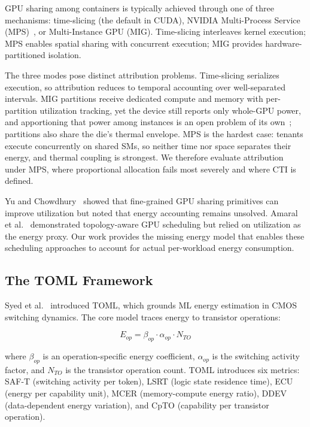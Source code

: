 \documentclass[conference]{IEEEtran}
\begin{document}
GPU sharing among containers is typically achieved through one of three mechanisms: time-slicing (the default in CUDA), NVIDIA Multi-Process Service (MPS)~\cite{nvidiamps2024}, or Multi-Instance GPU (MIG). Time-slicing interleaves kernel execution; MPS enables spatial sharing with concurrent execution; MIG provides hardware-partitioned isolation.

The three modes pose distinct attribution problems. Time-slicing serializes execution, so attribution reduces to temporal accounting over well-separated intervals. MIG partitions receive dedicated compute and memory with per-partition utilization tracking, yet the device still reports only whole-GPU power, and apportioning that power among instances is an open problem of its own~\cite{vamja2025mig}; partitions also share the die's thermal envelope. MPS is the hardest case: tenants execute concurrently on shared SMs, so neither time nor space separates their energy, and thermal coupling is strongest. We therefore evaluate attribution under MPS, where proportional allocation fails most severely and where CTI is defined.

Yu and Chowdhury~\cite{yu2020fine} showed that fine-grained GPU sharing primitives can improve utilization but noted that energy accounting remains unsolved. Amaral et al.~\cite{amaral2017topology} demonstrated topology-aware GPU scheduling but relied on utilization as the energy proxy. Our work provides the missing energy model that enables these scheduling approaches to account for actual per-workload energy consumption.

\subsection{The TOML Framework}

Syed et al.~\cite{syed2026toml} introduced TOML, which grounds ML energy estimation in CMOS switching dynamics. The core model traces energy to transistor operations:

\begin{equation}
E_{op} = \beta_{op} \cdot \alpha_{op} \cdot N_{TO}
\label{eq:toml_core}
\end{equation}

where $\beta_{op}$ is an operation-specific energy coefficient, $\alpha_{op}$ is the switching activity factor, and $N_{TO}$ is the transistor operation count. TOML introduces six metrics: SAF-T (switching activity per token), LSRT (logic state residence time), ECU (energy per capability unit), MCER (memory-compute energy ratio), DDEV (data-dependent energy variation), and CpTO (capability per transistor operation).
\end{document}

